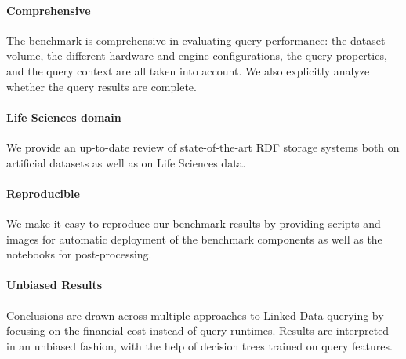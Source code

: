 \documentclass[twocolumn]{bmcart}%
\begin{document}
\paragraph{Comprehensive}
The benchmark is comprehensive in evaluating query performance: the dataset volume, the different hardware and engine configurations, the query properties, and the query context are all taken into account. We also explicitly analyze whether the query results are complete. 

\paragraph{Life Sciences domain}
We provide an up-to-date review of state-of-the-art RDF storage systems both on artificial datasets as well as on Life Sciences data. 


\paragraph{Reproducible}
We make it easy to reproduce our benchmark results by providing scripts and images for automatic deployment of the benchmark components as well as the notebooks for post-processing. 


\paragraph{Unbiased Results}
Conclusions are drawn across multiple approaches to Linked Data querying by focusing on the financial cost instead of query runtimes.
Results are interpreted in an unbiased fashion, with the help of decision trees trained on query features.

\end{document}
